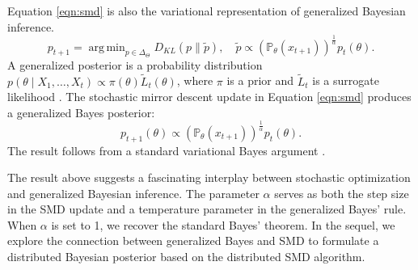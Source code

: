 \documentclass[twoside,11pt]{article}
\numberwithin{equation}{section}
\newcommand\bP{\mathbb{P}}
\newcommand\bp{\mathbb{p}}
\DeclareMathOperator*{\argmin}{arg\,min}
\begin{document}
Equation \eqref{eqn:smd} is also the variational representation of generalized Bayesian inference. 
\begin{equation}
     p_{t+1} = \argmin_{p \in \Delta_\Theta} D_{KL}(p \parallel \tilde p), \quad \tilde p \propto (\bP_\theta(x_{t+1}))^{\frac{1}{\alpha}} p_t(\theta). 
\end{equation}
A generalized posterior is a probability distribution $p(\theta \mid X_1, \ldots, X_t) \propto \pi(\theta) \tilde L_t(\theta)$, where $\pi$ is a prior and $\tilde L_t$ is a surrogate likelihood \citep{miller2021asymptotic}. The stochastic mirror descent update in Equation \eqref{eqn:smd} produces a generalized Bayes posterior:
\begin{equation}
\label{eqn:simple-bayes}
    p_{t+1}(\theta) \propto (\bP_\theta(x_{t+1}))^{\frac{1}{\alpha}} p_t(\theta). 
\end{equation}
The result follows from a standard variational Bayes argument \citep{knoblauch2022optimization}.

The result above suggests a fascinating interplay between stochastic optimization and generalized Bayesian inference. The parameter $\alpha$ serves as both the step size in the SMD update and a temperature parameter in the generalized Bayes’ rule. When $\alpha$ is set to 1, we recover the standard Bayes’ theorem. In the sequel, we explore the connection between generalized Bayes and SMD to formulate a distributed Bayesian posterior based on the distributed SMD algorithm.



\end{document}

